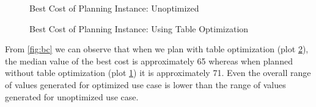 \begin{figure}[!htbp] %
	\centering
		\caption{Best Cost of Planning Instance: Unoptimized}
		\label{fig:bc1}
\end{figure}

\begin{figure}[!htbp]
	\centering
		\caption{Best Cost of Planning Instance: Using Table Optimization}
	\label{fig:bc2}
\end{figure}

From \ref{fig:bc} we can observe that when we plan with table optimization (plot \ref{fig:bc2}), the median value of the best cost is approximately 65 whereas  when planned without table optimization (plot \ref{fig:bc1}) it is approximately 71. Even the overall range of values generated for optimized use case is lower than the range of values generated for unoptimized use case.

